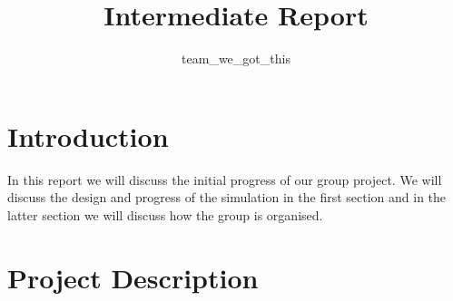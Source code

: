 \documentclass[11pt]{article}
\title{{Intermediate Report}}
\date{}
\author{team\_we\_got\_this}
\begin{document}
	\maketitle
	\thispagestyle{fancy}
	\section{Introduction}
	In this report we will discuss the initial progress of our group project. 
	We will discuss the design and progress of the simulation in the first section and in the latter section we will discuss how the group is organised.
	
	
	\section{Project Description}
	
\end{document}
